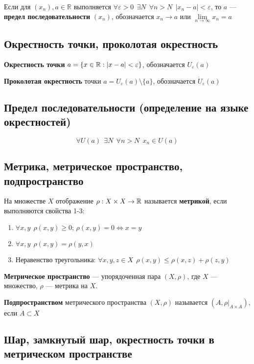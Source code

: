 Если для $(x_n), a\in\mathbb{R}$ выполняется
$\forall \varepsilon > 0 \ \ \exists N \ \ \forall n>N \ \ |x_n-a|<\varepsilon$,
то $a$ --- \textbf{предел последовательности} $(x_n)$, обозначается $x_n\to a$ или $\lim\limits_{n\to\infty}x_n=a$

\subsection{Окрестность точки, проколотая окрестность}

\textbf{Окрестность точки} $a = \{x\in\operatorname*{\mathbb{R}}: |x-a|<\varepsilon\}$, обозначается $U_\varepsilon(a)$


\textbf{Проколотая окрестность} точки $a = U_\varepsilon(a)\setminus \{a\}$, обозначается $\dot U_\varepsilon(a)$

\subsection{Предел последовательности (определение на языке окрестностей)}

$$\forall U(a) \ \ \exists N \ \ \forall n>N \ \ x_n\in U(a)$$

\subsection{Метрика, метрическое пространство, подпространство}

На множестве $X$ отображение $\rho: X\times X\to \operatorname*{\mathbb{R}}$ называется \textbf{метрикой}, если выполняются свойства 1-3:

\begin{enumerate}
    \itemsep0em
    \item $\forall x,y \ \ \rho(x,y)\geq 0$; $\rho(x,y)=0 \Leftrightarrow x=y$
    \item $\forall x,y \ \ \rho(x,y)=\rho(y,x)$
    \item Неравенство треугольника: $\forall x,y,z\in X \ \ \rho(x,y)\leq \rho(x,z)+\rho(z,y)$
\end{enumerate}

\textbf{Метрическое пространство} --- упорядоченная пара $(X, \rho)$, где $X$ --- множество, $\rho$ --- метрика на $X$.

\textbf{Подпространством} метрического пространства $(X,\rho)$ называется $(A, \rho|_{A\times A})$, если $A\subset X$

\subsection{Шар, замкнутый шар, окрестность точки в метрическом пространстве}

